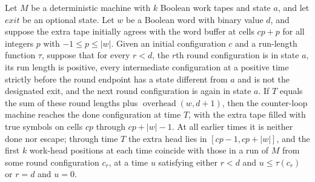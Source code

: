 \begin{theorem}
\label{Turing.counterLoopTMVia_run_done}
\leanok
{}
Let $M$ be a deterministic machine with $k$ Boolean work tapes and state $a$, and let
$exit$ be an optional state. Let $w$ be a Boolean word with binary value $d$, and
suppose the extra tape initially agrees with the word buffer at cells $cp+p$ for all
integers $p$ with $-1\le p\le |w|$. Given an initial configuration $c$ and a
run-length function $\tau$, suppose that for every $r<d$, the $r$th round configuration
is in state $a$, its run length is positive, every intermediate configuration at a
positive time strictly before the round endpoint has a state different from $a$ and is
not the designated exit, and the next round configuration is again in state $a$. If $T$
equals the sum of these round lengths plus $\operatorname{overhead}(w,d+1)$, then the
counter-loop machine reaches the done configuration at time $T$, with the extra tape
filled with true symbols on cells $cp$ through $cp+|w|-1$. At all earlier times it is
neither done nor escape; through time $T$ the extra head lies in $[cp-1,cp+|w|]$, and
the first $k$ work-head positions at each time coincide with those in a run of $M$ from
some round configuration $c_r$, at a time $u$ satisfying either $r<d$ and
$u\le\tau(c_r)$ or $r=d$ and $u=0$.
\end{theorem}

